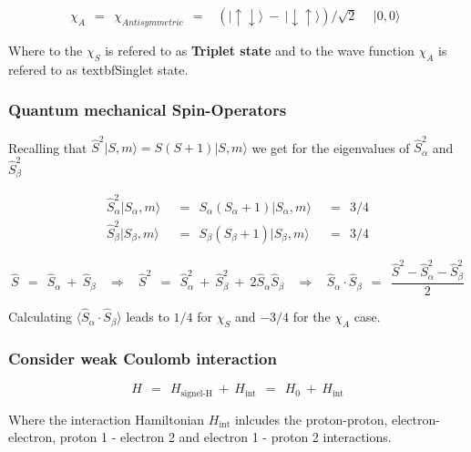 \documentclass[10pt]{report}
\numberwithin{equation}{chapter}
\begin{document}
\begin{equation}
  \chi_A ~~ = ~~ \chi_{Antisymmetric} ~~ = ~~ 
  \begin{array}{ll}
    \left(| \uparrow \downarrow \rangle ~-~ | \downarrow \uparrow \rangle \right) / \sqrt{2} &~~ | 0,0 \rangle 
  \end{array}
\end{equation}

Where to the $\chi_S$ is refered to as \textbf{Triplet state} and to the wave function $\chi_A$ is refered to as textbf{Singlet state}.


\subsubsection{Quantum mechanical Spin-Operators}

Recalling that $\hat{S}^2 |S,m \rangle = S(S+1) | S,m \rangle$ we get for the eigenvalues of $\hat{S}^2_\alpha$ and $\hat{S}^2_\beta$

\begin{align}
  \hat{S}^2_\alpha |S_\alpha,m\rangle ~~ & = ~~ S_\alpha (S_\alpha+1) |S_\alpha,m\rangle ~~ & = ~~ 3/4\\
  \hat{S}^2_\beta  |S_\beta,m\rangle ~~ & = ~~ S_\beta  (S_\beta+1)  |S_\beta,m\rangle ~~ & = ~~ 3/4
\end{align}


\begin{equation}
  \hat{S} ~~=~~ \hat{S}_\alpha ~+~ \hat{S}_\beta ~~~~ \Rightarrow ~~~~ 
  \hat{S}^2 ~~=~~ \hat{S}^2_\alpha ~+~ \hat{S}^2_\beta ~+~ 2 \hat{S}_\alpha \hat{S}_\beta ~~~~ \Rightarrow ~~~~
  \hat{S}_\alpha \cdot \hat{S}_\beta ~~=~~ \frac{\hat{S}^2 - \hat{S}^2_\alpha - \hat{S}^2_\beta}{2}
\end{equation}


Calculating $\langle \hat{S}_\alpha \cdot \hat{S}_\beta \rangle$ leads to $1/4$ for $\chi_S$ and $-3/4$ for the $\chi_A$ case.


\subsubsection{Consider weak Coulomb interaction}


\begin{equation}
  H ~~=~~ H_\text{signel-H} ~+~ H_\text{int} ~~=~~ H_0 ~+~ H_\text{int}
\end{equation}

Where the interaction Hamiltonian $H_\text{int}$ inlcudes the proton-proton, electron-electron, proton 1 - electron 2 and electron 1 - proton 2 interactions.
\end{document}
